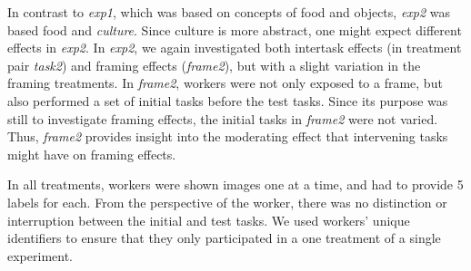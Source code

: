 \documentclass[12pt]{article}
\begin{document}
In contrast to \textit{exp1}, which was based on concepts of food and
objects, \textit{exp2} was based food and \textit{culture}.
Since culture is more abstract, one might expect different effects 
in \textit{exp2}.  In \textit{exp2}, we again investigated both
intertask effects (in treatment pair \textit{task2}) and framing effects 
(\textit{frame2}), but with a slight variation in the framing treatments.
In \textit{frame2}, workers were not only exposed to a frame, but also 
performed a set of initial tasks before the test tasks.  Since its purpose 
was still
to investigate framing effects, the initial tasks in \textit{frame2}
were not varied. Thus, \textit{frame2} provides insight into the moderating 
effect that intervening tasks might have on framing effects.

In all treatments, workers were shown images one at a time, and had to
provide 5 labels for each.  From the perspective of the worker, there was no
distinction or interruption between the initial and test tasks.  We used
workers' unique identifiers to ensure that they only participated in a 
one treatment of a single experiment.
\end{document}

